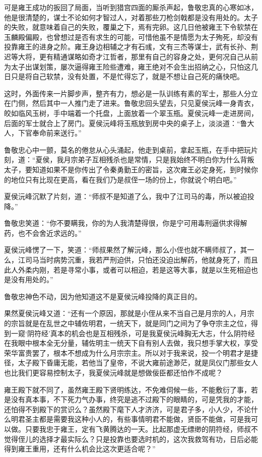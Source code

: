可是雍王成功的扳回了局面，当听到猎宫四面的厮杀声起，鲁敬忠真的心寒如冰，他是很清楚的，谋士不论如何才智过人，对着那些刀枪剑戟都是没有用处的。太子的失败，就意味着自己的失败，覆巢之下，焉有完卵。这几日他被雍王下令软禁在玉麟殿偏殿，也曾想过是否有求生的可能，可惜他虽不是情愿为太子殉死，却没有投靠雍王的进身之阶。雍王身边相辅之才有石彧，文有三杰等谋士，武有长孙、荆迟等大将，更有精通谋略如奇才江哲者，那里有自己的容身之处，更何况自己从前为太子出谋划策，屡次逼得雍王险些遭难，雍王绝对不会生出招纳之心，只怕这几日只是将自己软禁，没有处置，不是忙得忘了，就是不想让自己死的痛快吧。

这时，外面传来一片脚步声，整齐有力，想必是一队训练有素的军士，那些人分立在门侧，然后其中一人推门走了进来。鲁敬忠回头望去，只见夏侯沅峰一身青衣，皎如临风玉树，手中端着一个托盘，上面放着一个翠玉瓶。夏侯沅峰一走进房间，后面的军士就合上了房门。夏侯沅峰将玉瓶放到房中央的桌子上，淡淡道：“鲁大人，下官奉命前来送行。”

鲁敬忠心中一颤，莫名的倦怠从心头涌起，他走到桌前，拿起玉瓶，在手中把玩片刻，道：“夏侯，我月宗弟子互相残杀也是常情，只是我始终不明白你为什么背叛太子，要知道如果不是你传出了令秦勇勤王的密旨，这次雍王必定身死，到时候你的地位只有比现在更高，看在我们乃是叔侄一场的份上，你就说个明白吧。”

夏侯沅峰沉默了片刻，道：“师叔不是知道了么，我中了江司马的毒，所以被迫投降。”

鲁敬忠笑道：“你不要瞒我，你的为人我清楚得很，你是宁可用毒刑逼供求得解药，也不会舍近求远的。”

夏侯沅峰愣了一下，笑道：“师叔果然了解沅峰，那么小侄也就不瞒师叔了，其一么，江司马当时病势沉重，我若严刑迫供，只怕还没迫出解药，他就身死了，而且此人外柔内刚，若是寻常小事，或者可以相迫，若是这等大事，就是以生死相迫也是没有用处的。”

鲁敬忠神色不动，因为他知道这不是夏侯沅峰投降的真正目的。

果然夏侯沅峰又道：“还有一个原因，那就是小侄从来不当自己是月宗的人，月宗的宗旨就是在乱世之中辅佐明君，一统天下，就是同门之间为了争夺宗主之位，得到一窥‘阴符经’真本的机会也是互相残杀，可是我夏侯沅峰胸无大志，什么阴符经在我眼中根本全无分量，辅佐明主一统天下自有别人去做，我只想手掌大权，享受荣华富贵罢了，根本不想成为什么月宗宗主。所以对于我来说，投一个明君才是捷径，太子殿下昏庸无能，若他当了皇帝，不说大雍前途渺茫，就是凤仪门那些女人也比我们更容易控制太子，我夏侯沅峰就是想做佞臣都还怕作不成呢？

雍王殿下就不同了，虽然雍王殿下贤明练达，不免难伺候一些，不能敷衍了事，若是没有真本事，不下死力气办事，终究是逃不过殿下的眼睛的，可是凭我的才能，还怕得不到殿下的赏识么？虽然殿下麾下人才济济，可是君子多，小人少，不论什么明君圣主都是需要我这种小人的，有些事情明君不能做，贤臣不能做，可是我可以做。只要我忠于雍王，定有飞黄腾达的一天。比起那虚无缥缈的阴符经，师叔不觉得侄儿的选择才最实际么？只是投靠也要选时机的，这次我救驾有功，日后必能得到雍王重用，还有什么机会比这次更适合呢？”

